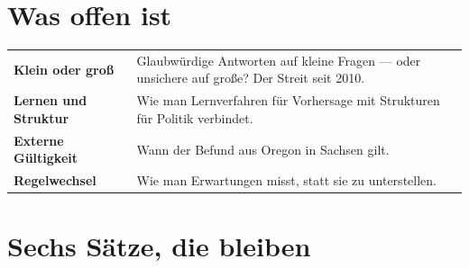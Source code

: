 \section{Was offen ist}

\begin{merksatz}
\begin{center}
{\small
\renewcommand{\arraystretch}{1.55}
\begin{tabular}{@{}P{3.0cm}P{5.6cm}@{}}
\toprule
\textbf{Klein oder groß} & Glaubwürdige Antworten auf kleine Fragen --- oder unsichere auf große? Der Streit seit 2010.\\
\textbf{Lernen und Struktur} & Wie man Lernverfahren für Vorhersage mit Strukturen für Politik verbindet.\\
\textbf{Externe Gültigkeit} & Wann der Befund aus Oregon in Sachsen gilt.\\
\textbf{Regelwechsel} & Wie man Erwartungen misst, statt sie zu unterstellen.\\
\bottomrule
\end{tabular}}
\end{center}

\begin{center}
\begin{minipage}{0.88\textwidth}
\end{minipage}
\end{center}
\end{merksatz}

\section{Sechs Sätze, die bleiben}

